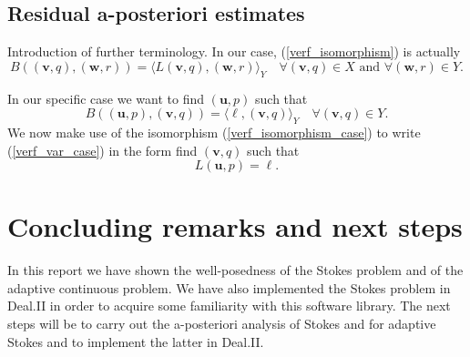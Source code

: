 \documentclass[12pt,a4paper]{article}
\theoremstyle{definition}
\begin{document}
\subsection{Residual a-posteriori estimates}
Introduction of further terminology.  In our case, (\ref{verf_isomorphism}) is actually
 \begin{equation}\label{verf_isomorphism_case}
 B\left(\left(\textbf{v},q\right),\left(\textbf{w},r\right)\right)=\langle L\left(\textbf{v},q\right),\left(\textbf{w},r\right)\rangle_Y\quad \forall \left(\textbf{v},q\right) \in X\text{ and }\forall \left(\textbf{w},r\right) \in Y.
 \end{equation}
 
 In our specific case we want to find $\left(\textbf{u},p\right)$ such that 
 \begin{equation}\label{verf_var_case}
 B\left(\left(\textbf{u},p\right),\left(\textbf{v},q\right)\right)=\langle\ell,\left(\textbf{v},q\right)\rangle_Y\quad \forall \left(\textbf{v},q\right) \in Y.
 \end{equation}
 We now make use of the isomorphism (\ref{verf_isomorphism_case}) to write (\ref{verf_var_case}) in the form find  $\left(\textbf{v},q\right)$ such that
 \begin{equation}
  L\left(\textbf{u},p\right)=\ell.
 \end{equation}
\section{Concluding remarks and next steps}\label{sec_conclusion}
In this report we have shown the well-posedness of the Stokes problem and of the adaptive continuous problem.  We have also implemented the Stokes problem in Deal.II in order to acquire some familiarity with this software library.  The next steps will be to carry out the a-posteriori analysis of Stokes and for adaptive Stokes and to implement the latter  in Deal.II.  



\end{document}
